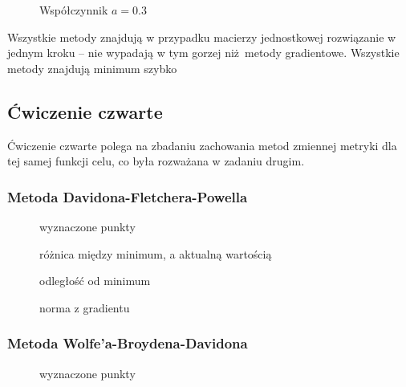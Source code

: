 \documentclass[a4paper, 10pt]{article}
\begin{document}
			
			    \begin{figure}[H]
			        \centering
			        \def \svgwidth{0.75\columnwidth}
			        
			        \caption{Współczynnik $a=0.3$}
			    \end{figure}\noindent
			Wszystkie metody znajdują w przypadku macierzy jednostkowej rozwiązanie w jednym kroku -- nie wypadają w tym gorzej niż metody gradientowe. Wszystkie metody znajdują minimum szybko 
		\subsection{Ćwiczenie czwarte}
			Ćwiczenie czwarte polega na zbadaniu zachowania metod zmiennej metryki dla tej samej funkcji celu, co była rozważana w zadaniu drugim.
			\subsubsection{Metoda Davidona-Fletchera-Powella}
			    \begin{figure}[H]
			        \centering
			        \def \svgwidth{0.75\columnwidth}
			        
			        \caption{wyznaczone punkty}
			    \end{figure}\noindent
			
			
			    \begin{figure}[H]
			        \centering
			        \def \svgwidth{0.75\columnwidth}
			        
			        \caption{różnica między minimum, a aktualną wartością}
			    \end{figure}\noindent
			
			
			    \begin{figure}[H]
			        \centering
			        \def \svgwidth{0.75\columnwidth}
			        
			        \caption{odległość od minimum}
			    \end{figure}\noindent
				\begin{figure}[H]
				   	\centering
				   	\def \svgwidth{0.75\columnwidth}
				   	
				   	\caption{norma z gradientu}
				\end{figure}\noindent
			\subsubsection{Metoda Wolfe'a-Broydena-Davidona}
			    \begin{figure}[H]
			        \centering
			        \def \svgwidth{0.75\columnwidth}
			        
			        \caption{wyznaczone punkty}
			    \end{figure}\noindent
			
\end{document}
